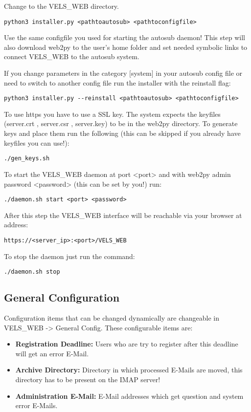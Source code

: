 Change to the VELS\_WEB directory.

\begin{verbatim}
python3 installer.py <pathtoautosub> <pathtoconfigfile>
\end{verbatim}

Use the same configfile you used for starting the autosub daemon! This step will
also download web2py to the user's home folder and set needed symbolic links to 
connect VELS\_WEB to the autosub system.

If you change parameters in the category $[$system$]$ in your autosub config file or need to switch to 
another config file run the installer with the reinstall flag:

\begin{verbatim}
python3 installer.py --reinstall <pathtoautosub> <pathtoconfigfile>
\end{verbatim}

To use https you have to use a SSL key. The system expects the keyfiles
(server.crt , server.csr , server.key) to be in the web2py directory. To
generate keys and place them run the following (this can be skipped if you 
already have keyfiles you can use!):

\begin{verbatim}
./gen_keys.sh    
\end{verbatim}

To start the VELS\_WEB daemon at port <port> and with web2py admin password 
<password> (this can be set by you!) run:
\begin{verbatim}
./daemon.sh start <port> <password> 
\end{verbatim}

After this step the VELS\_WEB interface will be reachable via your browser at
address:
\begin{verbatim}
https://<server_ip>:<port>/VELS_WEB
\end{verbatim}

To stop the daemon just run the command:

\begin{verbatim}
./daemon.sh stop
\end{verbatim}

\subsection{General Configuration}\label{sub:generalconfig}
Configuration items that can be changed dynamically are changeable in VELS\_WEB ->
General Config. These configurable items are:
\begin{itemize}
\item {\bf Registration Deadline:} Users who are try to register after this deadline will
    get an error E-Mail.
\item {\bf Archive Directory:} Directory in which processed E-Mails are moved, this
    directory has to be present on the IMAP server!
\item {\bf Administration E-Mail:} E-Mail addresses which get question and system error E-Mails.

\end{itemize}

